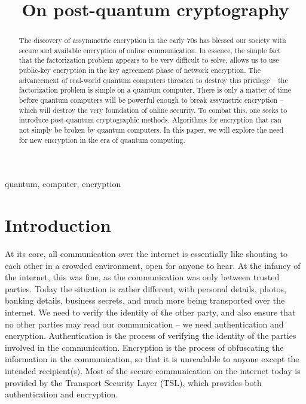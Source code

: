 \documentclass[conference]{IEEEtran}
\begin{document}
\title{On post-quantum cryptography}

\author{}

\maketitle

\begin{abstract}
  The discovery of assymmetric encryption in the early 70s has blessed our society with secure and available encryption of online communication.
  In essence, the simple fact that the factorization problem appears to be very difficult to solve, allows us to use public-key encryption in the key agreement phase of network encryption.
  The advancement of real-world quantum computers threaten to destroy this privilege -- the factorization problem is simple on a quantum computer.
  There is only a matter of time before quantum computers will be powerful enough to break assymetric encryption -- which will destroy the very foundation of online security.
  To combat this, one seeks to introduce post-quantum cryptographic methods.
  Algorithms for encryption that can not simply be broken by quantum computers.
  In this paper, we will explore the need for new encryption in the era of quantum computing.
\end{abstract}

\begin{IEEEkeywords}
quantum, computer, encryption
\end{IEEEkeywords}

\section{Introduction}
At its core, all communication over the internet is essentially like shouting to each other in a crowded environment, open for anyone to hear.
At the infancy of the internet, this was fine, as the communication was only between trusted parties.
Today the situation is rather different, with personal details, photos, banking details, business secrets, and much more being transported over the internet.
We need to verify the identity of the other party, and also ensure that no other parties may read our communication -- we need authentication and encryption.
Authentication is the process of verifying the identity of the parties involved in the communication.
Encryption is the process of obfuscating the information in the communication, so that it is unreadable to anyone except the intended recipient(s).
Most of the secure communication on the internet today is provided by the Transport Security Layer (TSL)\cite{sslpulse.2020}, which provides both authentication and encryption.
\end{document}
